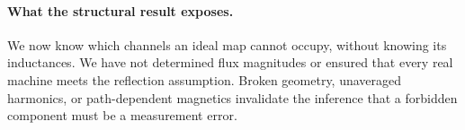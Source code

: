 \paragraph{What the structural result exposes.}
We now know which channels an ideal map cannot occupy, without knowing its
inductances. We have not determined flux magnitudes or ensured that every
real machine meets the reflection assumption. Broken geometry, unaveraged
harmonics, or path-dependent magnetics invalidate the inference that a
forbidden component must be a measurement error.
